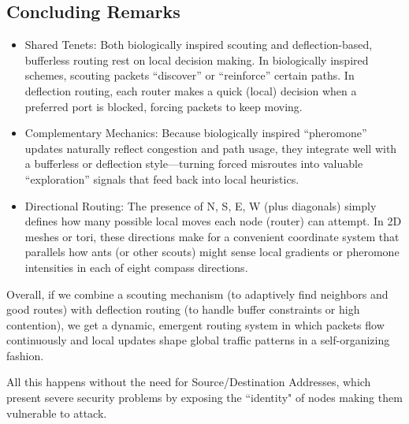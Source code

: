 \subsection{Concluding Remarks}

\begin{itemize}
\item Shared Tenets: Both biologically inspired scouting and deflection-based, bufferless routing rest on local decision making. In biologically inspired schemes, scouting packets “discover” or “reinforce” certain paths. In deflection routing, each router makes a quick (local) decision when a preferred port is blocked, forcing packets to keep moving.
\item Complementary Mechanics: Because biologically inspired “pheromone” updates naturally reflect congestion and path usage, they integrate well with a bufferless or deflection style—turning forced misroutes into valuable “exploration” signals that feed back into local heuristics.
\item Directional Routing: The presence of N, S, E, W (plus diagonals) simply defines how many possible local moves each node (router) can attempt. In 2D meshes or tori, these directions make for a convenient coordinate system that parallels how ants (or other scouts) might sense local gradients or pheromone intensities in each of eight compass directions.
\end{itemize}

Overall, if we combine a scouting mechanism (to adaptively find neighbors and good routes) with deflection routing (to handle buffer constraints or high contention), we get a dynamic, emergent routing system in which packets flow continuously and local updates shape global traffic patterns in a self-organizing fashion.

All this happens without the need for Source/Destination Addresses, which present severe security problems by exposing the ``identity" of nodes making them vulnerable to attack.